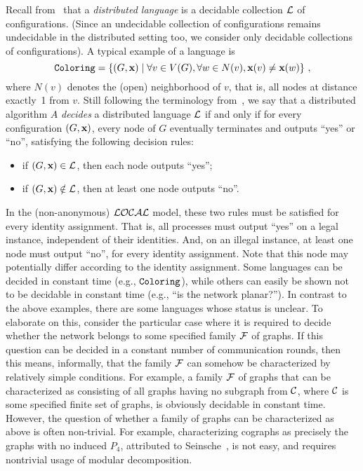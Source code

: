 \documentclass{llncs}
\newcommand{\local}{{\cal LOCAL}}
\newcommand{\inp}{\mbox{\rm\bf x}}
\newcommand{\coloring}{\mbox{\tt Coloring}}
\def\cF{{\cal F}}
\def\cL{{\cal L}}
\begin{document}
Recall from~\cite{FKP11} that a {\em distributed language} is a decidable collection $\cL$ of configurations. (Since an undecidable collection of configurations remains undecidable in the distributed setting too, we consider only decidable collections of configurations). A typical example of a language is 
\[
\coloring= \{(G,\inp) \;|\; \forall v\in V(G), \forall w\in N(v), \inp(v) \neq \inp(w)\}\ ,
\]
where $N(v)$ denotes the (open) neighborhood of $v$, that is, all nodes at distance exactly~1 from $v$. Still following the terminology from~\cite{FKP11}, we say that a distributed algorithm $A$ \emph{decides} a distributed language $\cL$ if and only if for every configuration $(G,\inp)$, every node of $G$ eventually terminates and outputs ``yes'' or ``no'', satisfying the following decision rules: 
\begin{itemize}
\item 
if $(G,\inp)\in \cL$, then each node outputs ``yes'';
\item 
if $(G,\inp)\notin \cL$, then at least one node outputs ``no''.
\end{itemize}
In the (non-anonymous) $\local$ model, these two rules must be satisfied for every identity assignment. That is, all processes must output ``yes'' on a legal instance, independent of their identities. And, on an illegal instance, at least one node must output ``no'', for every identity assignment. Note that this node may potentially differ according to the identity assignment. Some languages can be decided in constant time  (e.g., $\coloring$), while others can easily be shown not to be decidable in constant time (e.g., ``is  the network planar?''). In contrast to the above examples, there are some languages whose status is unclear. To elaborate on this, consider the particular case where it is required to decide whether the network belongs to some specified family $\cF$ of graphs. If this question can be decided in a constant number of communication rounds, then this means, informally, that the family $\cF$ can somehow be characterized by relatively simple conditions. For example, a family $\cF$ of graphs that can be characterized as consisting of all graphs having no subgraph from $\cal C$, where $\cal C$ is some specified finite set of graphs, is obviously decidable in constant time. However, the question of whether a family of graphs can be characterized as above is often non-trivial. For example, characterizing cographs as precisely the graphs with no induced $P_4$, attributed to Seinsche~\cite{Seinsche74}, is not easy, and requires nontrivial usage of modular decomposition.
\end{document}
